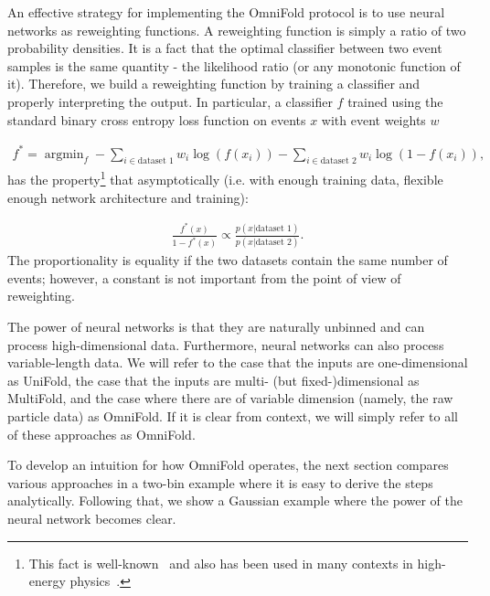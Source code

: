 \documentclass[NOTE, atlasdraft=true, texlive=2016, UKenglish]{\ATLASLATEXPATH atlasdoc}
\DeclareMathOperator*{\argmin}{argmin}
\begin{document}
An effective strategy for implementing the OmniFold protocol is to use neural networks as reweighting functions.  A reweighting function is simply a ratio of two probability densities.  It is a fact that the optimal classifier between two event samples is the same quantity - the likelihood ratio (or any monotonic function of it).  Therefore, we build a reweighting function by training a classifier and properly interpreting the output.  In particular, a classifier $f$ trained using the standard binary cross entropy loss function on events $x$ with event weights $w$

\begin{align}
\label{eq:binarycrossentropy}
	f^*=\argmin_f-\sum_{i\in\text{dataset 1}}w_i \log(f(x_i)) -\sum_{i\in\text{dataset 2}} w_i\log(1-f(x_i)),
\end{align}
%
has the property\footnote{This fact is well-known~\cite{hastie01statisticallearning,sugiyama_suzuki_kanamori_2012} and also has been used in many contexts in high-energy physics~\cite{2010.03569,1907.08209,Stoye:2018ovl,Hollingsworth:2020kjg,Brehmer:2018kdj,Brehmer:2018eca,Brehmer:2019xox,Brehmer:2018hga,Cranmer:2015bka,Badiali:2020wal,Andreassen:2020nkr,Andreassen:2019cjw,Fischer-ACAT2019}.} that asymptotically (i.e. with enough training data, flexible enough network architecture and training):

\begin{align}
\frac{f^*(x)}{1-f^*(x)}\propto \frac{p(x|\text{dataset 1})}{p(x|\text{dataset 2})}.
\end{align}
%
The proportionality is equality if the two datasets contain the same number of events; however, a constant is not important from the point of view of reweighting.

The power of neural networks is that they are naturally unbinned and can process high-dimensional data.  Furthermore, neural networks can also process variable-length data.  We will refer to the case that the inputs are one-dimensional as UniFold, the case that the inputs are multi- (but fixed-)dimensional as MultiFold, and the case where there are of variable dimension (namely, the raw particle data) as OmniFold.  If it is clear from context, we will simply refer to all of these approaches as OmniFold.

To develop an intuition for how OmniFold operates, the next section compares various approaches in a two-bin example where it is easy to derive the steps analytically.  Following that, we show a Gaussian example where the power of the neural network becomes clear.
\end{document}
